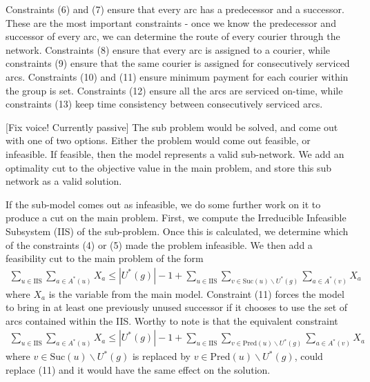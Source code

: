 \documentclass{article}
\newcommand{\Pred}{\text{Pred}}
\newcommand{\Suc}{\text{Suc}}
\begin{document}
Constraints (6) and (7) ensure that every arc has a predecessor and a successor. These are the most important constraints - once we know the predecessor and successor of every arc, we can determine the route of every courier through the network. Constraints (8) ensure that every arc is assigned to a courier, while constraints (9) ensure that the same courier is assigned for consecutively serviced arcs. Constraints (10) and (11) ensure minimum payment for each courier within the group is set. Constraints (12) ensure all the arcs are serviced on-time, while constraints (13) keep time consistency between consecutively serviced arcs.

[Fix voice! Currently passive]
The sub problem would be solved, and come out with one of two options. Either the problem would come out feasible, or infeasible. If feasible, then the model represents a valid sub-network. We add an optimality cut to the objective value in the main problem, and store this sub network as a valid solution.

If the sub-model comes out as infeasible, we do some further work on it to produce a cut on the main problem. First, we compute the Irreducible Infeasible Subsystem (IIS) of the sub-problem. Once this is calculated, we determine which of the constraints (4) or (5) made the problem infeasible. We then add a feasibility cut to the main problem of the form \begin{align}\sum_{u\in \text{IIS}}\sum_{a\in A^*(u)}X_a\leq|U^*(g)|-1+\sum_{u\in \text{IIS}}\sum_{v\in\Suc(u)\backslash U^*(g)}\sum_{a\in A^*(v)}X_a\end{align} where $X_a$ is the variable from the main model. Constraint (11) forces the model to bring in at least one previously unused successor if it chooses to use the set of arcs contained within the IIS. Worthy to note is that the equivalent constraint \begin{align}\sum_{u\in \text{IIS}}\sum_{a\in A^*(u)}X_a\leq|U^*(g)|-1+\sum_{u\in \text{IIS}}\sum_{v\in\Pred(u)\backslash U^*(g)}\sum_{a\in A^*(v)}X_a\end{align} where $v\in\Suc(u)\backslash U^*(g)$ is replaced by $v\in\Pred(u)\backslash U^*(g)$, could replace (11) and it would have the same effect on the solution.
\end{document}
